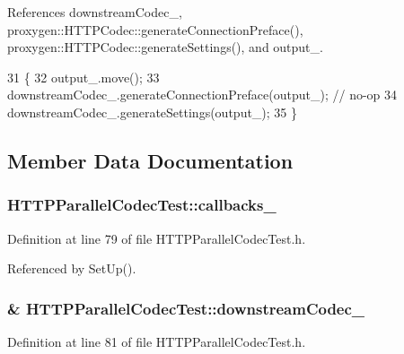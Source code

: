 References downstream\+Codec\+\_\+, proxygen\+::\+H\+T\+T\+P\+Codec\+::generate\+Connection\+Preface(), proxygen\+::\+H\+T\+T\+P\+Codec\+::generate\+Settings(), and output\+\_\+.


\begin{DoxyCode}
31                            \{
32     output_.move();
33     downstreamCodec_.generateConnectionPreface(output_); \textcolor{comment}{// no-op}
34     downstreamCodec_.generateSettings(output_);
35   \}
\end{DoxyCode}


\subsection{Member Data Documentation}
\subsubsection[{callbacks\+\_\+}]{ H\+T\+T\+P\+Parallel\+Codec\+Test\+::callbacks\+\_\+\hspace{0.3cm}{\ttfamily [protected]}}\label{classHTTPParallelCodecTest_af565b3513eafa69aa5e4aab75b7b3ffc}


Definition at line 79 of file H\+T\+T\+P\+Parallel\+Codec\+Test.\+h.



Referenced by Set\+Up().

\subsubsection[{downstream\+Codec\+\_\+}]{\& H\+T\+T\+P\+Parallel\+Codec\+Test\+::downstream\+Codec\+\_\+\hspace{0.3cm}{\ttfamily [protected]}}\label{classHTTPParallelCodecTest_ae920b088b6a100373400915c47deca8b}


Definition at line 81 of file H\+T\+T\+P\+Parallel\+Codec\+Test.\+h.



